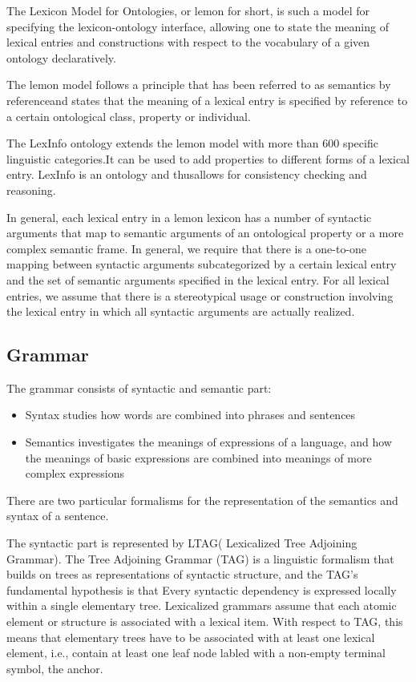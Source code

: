 The Lexicon Model for Ontologies, or lemon for short, is such a model for specifying the lexicon-ontology interface, allowing one to state the meaning of lexical entries and constructions with respect to the vocabulary of a given ontology declaratively.

The lemon model follows a principle that has been referred to as semantics by referenceand states that the meaning of a lexical entry is specified by reference to a certain ontological class, property or individual.

The LexInfo ontology extends the lemon model with more than 600 specific linguistic categories.It can be used to add properties to different forms of a lexical entry. LexInfo is an ontology and thusallows for consistency checking and reasoning. 

In general, each lexical entry in a lemon lexicon has a number of syntactic arguments that map to semantic arguments of an ontological property or a more complex semantic frame. In general, we require that there is a one-to-one mapping between syntactic arguments subcategorized by a certain lexical entry and the set of semantic arguments specified in the lexical entry. For all lexical entries, we assume that there is a stereotypical usage or construction involving the lexical entry in which all syntactic arguments are actually realized.

\subsection{Grammar}
The grammar consists of syntactic and semantic part:
\begin{itemize} 
  \item Syntax studies how words are combined into phrases and sentences
  \item Semantics investigates the meanings of expressions of a language, and how the meanings of basic expressions are combined into meanings of more complex expressions
\end{itemize} 
There are two particular formalisms for the representation of the semantics and syntax of a sentence.

The syntactic part is represented by LTAG( Lexicalized Tree Adjoining Grammar).  
The Tree Adjoining Grammar (TAG) is a linguistic formalism that builds on trees as representations of syntactic structure, and the TAG's fundamental hypothesis is that Every syntactic dependency is expressed locally within a single elementary tree. Lexicalized grammars assume that each atomic element or structure is associated with a lexical item. With respect to TAG, this means that elementary trees have to be associated with at least one lexical element, i.e., contain at least one leaf node labled with a non-empty terminal symbol, the anchor.

